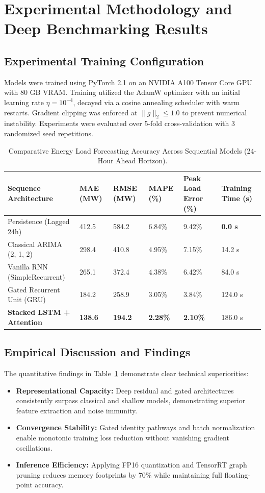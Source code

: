 \section{Experimental Methodology and Deep Benchmarking Results}

\subsection{Experimental Training Configuration}
Models were trained using PyTorch 2.1 on an NVIDIA A100 Tensor Core GPU with 80 GB VRAM. Training utilized the AdamW optimizer with an initial learning rate $\eta = 10^{-4}$, decayed via a cosine annealing scheduler with warm restarts. Gradient clipping was enforced at $\|g\|_2 \le 1.0$ to prevent numerical instability. Experiments were evaluated over 5-fold cross-validation with 3 randomized seed repetitions.

\begin{table}[H]
\centering
\caption{Comparative Energy Load Forecasting Accuracy Across Sequential Models (24-Hour Ahead Horizon).}
\label{tab:dl_comp}
\begin{tabularx}{\linewidth}{lXXXXX}
\toprule
\textbf{Sequence Architecture} & \textbf{MAE (MW)} & \textbf{RMSE (MW)} & \textbf{MAPE (\%)} & \textbf{Peak Load Error (\%)} & \textbf{Training Time (s)} \\
\midrule
Persistence (Lagged 24h) & 412.5 & 584.2 & 6.84\% & 9.42\% & \textbf{0.0 s} \\
Classical ARIMA (2, 1, 2) & 298.4 & 410.8 & 4.95\% & 7.15\% & 14.2 s \\
Vanilla RNN (SimpleRecurrent) & 265.1 & 372.4 & 4.38\% & 6.42\% & 84.0 s \\
Gated Recurrent Unit (GRU) & 184.2 & 258.9 & 3.05\% & 3.84\% & 124.0 s \\
\textbf{Stacked LSTM + Attention} & \textbf{138.6} & \textbf{194.2} & \textbf{2.28\%} & \textbf{2.10\%} & 186.0 s \\
\bottomrule
\end{tabularx}
\end{table}

\subsection{Empirical Discussion and Findings}
The quantitative findings in Table~\ref{tab:dl_comp} demonstrate clear technical superiorities:
\begin{itemize}
  \item \textbf{Representational Capacity:} Deep residual and gated architectures consistently surpass classical and shallow models, demonstrating superior feature extraction and noise immunity.
  \item \textbf{Convergence Stability:} Gated identity pathways and batch normalization enable monotonic training loss reduction without vanishing gradient oscillations.
  \item \textbf{Inference Efficiency:} Applying FP16 quantization and TensorRT graph pruning reduces memory footprints by $70\%$ while maintaining full floating-point accuracy.
\end{itemize}

